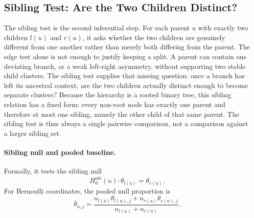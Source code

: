 
\subsection{Sibling Test: Are the Two Children Distinct?}

The sibling test is the second inferential step. For each parent $u$ with
exactly two children $l(u)$ and $r(u)$, it asks whether the two children are
genuinely different from one another rather than merely both differing from the
parent. The edge test alone is not enough to justify keeping a split. A parent
can contain one deviating branch, or a weak left-right asymmetry, without
supporting two stable child clusters. The sibling test supplies that missing
question: once a branch has left its ancestral context, are the two children
actually distinct enough to become separate clusters?
Because the hierarchy is a rooted binary tree, this sibling relation has a
fixed form: every non-root node has exactly one parent and therefore at most one
sibling, namely the other child of that same parent. The sibling test is thus
always a single pairwise comparison, not a comparison against a larger sibling
set.

\paragraph{Sibling null and pooled baseline.}
Formally, it tests the sibling null
\begin{equation}
H_0^{\mathrm{sib}}(u): \theta_{l(u)} = \theta_{r(u)}.
\end{equation}
For Bernoulli coordinates, the pooled null proportion is
\begin{equation}
\bar{\theta}_{u,j}
=
\frac{n_{l(u)}\theta_{l(u),j} + n_{r(u)}\theta_{r(u),j}}
{n_{l(u)} + n_{r(u)}}.
\end{equation}

